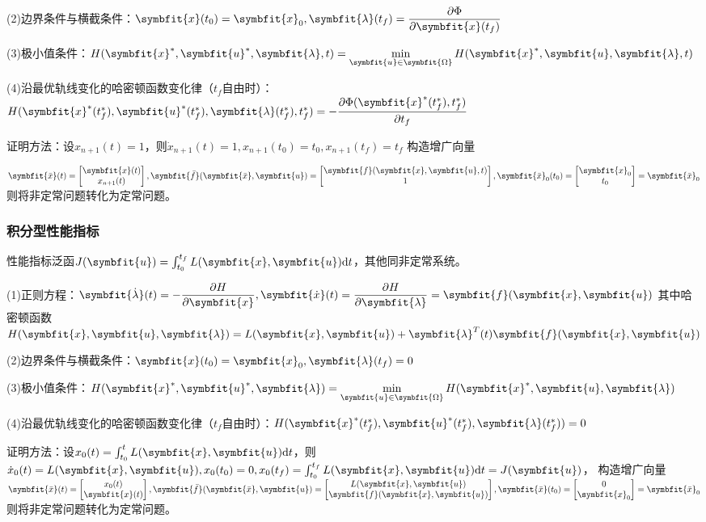 \documentclass[11pt,a4paper]{ctexart}
\renewcommand{\d}{{\rm d}}
\newcommand{\bm}{\symbfit}
\begin{document}
            (2)边界条件与横截条件：$\bm{x}(t_0)=\bm{x}_0,\bm{\lambda}(t_f)=\dfrac{\partial\Phi}{\partial\bm{x}(t_f)}$

            (3)极小值条件：$H(\bm{x}^*,\bm{u}^*,\bm{\lambda},t)=\min\limits_{\bm{u}\in\bm{\Omega}}H(\bm{x}^*,\bm{u},\bm{\lambda},t)$

            (4)沿最优轨线变化的哈密顿函数变化律（$t_f$自由时）：$H(\bm{x}^*(t_f^*),\bm{u}^*(t_f^*),\bm{\lambda}(t_f^*),t_f^*)=-\dfrac{\partial\Phi(\bm{x}^*(t_f^*),t_f^*)}{\partial t_f}$

            证明方法：设$x_{n+1}(t)=1$，则$\dot{x}_{n+1}(t)=1,x_{n+1}(t_0)=t_0,x_{n+1}(t_f)=t_f$
            构造增广向量
            
            $\bm{\bar x}(t)=\begin{bmatrix}\bm{x}(t)\\x_{n+1}(t)\end{bmatrix},\bm{\bar f}(\bm{\bar x},\bm{u})=
            \begin{bmatrix}\bm{f}(\bm{x},\bm{u},t)\\1\end{bmatrix},\bm{\bar x}_0(t_0)=\begin{bmatrix}\bm{x}_0\\t_0\end{bmatrix}=\bm{\bar x}_0$
            则将非定常问题转化为定常问题。
        \subsubsection{积分型性能指标}
            性能指标泛函$J(\bm{u})=\int_{t_0}^{t_f}L(\bm{x},\bm{u})\d t$，其他同非定常系统。

            (1)正则方程：$\bm{\dot\lambda}(t)=-\dfrac{\partial H}{\partial\bm{x}},\bm{\dot x}(t)=\dfrac{\partial H}{\partial\bm{\lambda}}=\bm{f}(\bm{x},\bm{u})$
            其中哈密顿函数$H(\bm{x},\bm{u},\bm{\lambda})=L(\bm{x},\bm{u})+\bm{\lambda}^T(t)\bm{f}(\bm{x},\bm{u})$
            
            (2)边界条件与横截条件：$\bm{x}(t_0)=\bm{x}_0,\bm{\lambda}(t_f)=0$
            
            (3)极小值条件：$H(\bm{x}^*,\bm{u}^*,\bm{\lambda})=\min\limits_{\bm{u}\in\bm{\Omega}}H(\bm{x}^*,\bm{u},\bm{\lambda})$
            
            (4)沿最优轨线变化的哈密顿函数变化律（$t_f$自由时）：$H(\bm{x}^*(t_f^*),\bm{u}^*(t_f^*),\bm{\lambda}(t_f^*))=0$

            证明方法：设$x_0(t)=\int_{t_0}^{t}L(\bm{x},\bm{u})\d t$，则$\dot{x}_0(t)=L(\bm{x},\bm{u}),x_0(t_0)=0,x_0(t_f)=\int_{t_0}^{t_f}L(\bm{x},\bm{u})\d t=J(\bm{u})$，
            构造增广向量$\bm{\bar x}(t)=\begin{bmatrix}x_0(t)\\\bm{x}(t)\end{bmatrix},\bm{\bar f}(\bm{\bar x},\bm{u})=\begin{bmatrix}L(\bm{x},\bm{u})\\\bm{f}(\bm{x},\bm{u})\end{bmatrix},
            \bm{\bar x}(t_0)=\begin{bmatrix}0\\\bm{x}_0\end{bmatrix}=\bm{\bar x}_0$
            则将非定常问题转化为定常问题。
\end{document}
